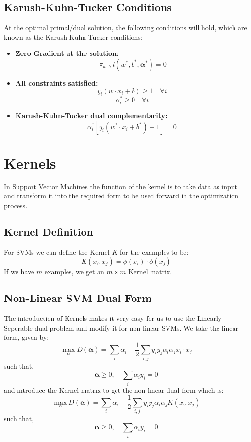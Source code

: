 \documentclass[12pt, a4paper]{book}
\begin{document}
\subsection{Karush-Kuhn-Tucker Conditions}
At the optimal primal/dual solution, the following conditions will hold, which are known as the Karush-Kuhn-Tucker conditions:
\begin{itemize}
    \item \textbf{Zero Gradient at the solution:}
    $$\triangledown_{w,b}l(w^*,b^*,\boldsymbol\alpha^*) = 0$$
    \item \textbf{All constraints satisfied:}
    $$y_i(w\cdot x_i +b) \geq 1 \quad \forall i$$
    $$\alpha^*_i \geq 0 \quad \forall i$$
    \item \textbf{Karush-Kuhn-Tucker dual complementarity:}
    $$\alpha_i^*\left[y_i(w^*\cdot x_i + b^*) - 1\right] = 0$$
\end{itemize}

\section{Kernels}
In Support Vector Machines the function of the kernel is to take data as input and transform it into the required form to be used forward in the optimization process.

\subsection{Kernel Definition}
For SVMs we can define the Kernel $K$ for the examples to be:
$$K(x_i,x_j) = \phi(x_i)\cdot\phi(x_j)$$
If we have $m$ examples, we get an $m\times m$ Kernel matrix.

\subsection{Non-Linear SVM Dual Form}
The introduction of Kernels makes it very easy for us to use the Linearly Seperable dual problem and modify it for non-linear SVMs. We take the linear form, given by:
$$\max_{\alpha}D(\boldsymbol{\alpha}) = \sum_i\alpha_i -\frac{1}{2} \sum_{i,j}y_iy_j\alpha_i\alpha_jx_i\cdot x_j$$
such that,
$$\boldsymbol{\alpha} \geq 0, \quad \sum_i\alpha_iy_i = 0$$
and introduce the Kernel matrix to get the non-linear dual form which is:
$$\max_{\alpha}D(\boldsymbol{\alpha}) = \sum_i\alpha_i -\frac{1}{2} \sum_{i,j}y_iy_j\alpha_i\alpha_jK(x_i,x_j)$$
such that,
$$\boldsymbol{\alpha} \geq 0, \quad \sum_i\alpha_iy_i = 0$$
\end{document}
